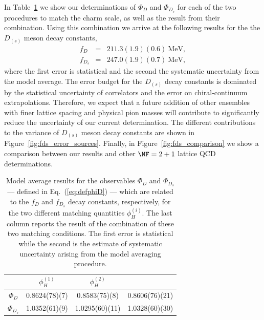 In Table~\ref{tab:dec_res_all_matching} we show our determinations of $\Phi_D$
and $\Phi_{D_s}$ for each of the two procedures to match the charm scale, as well
as the result from their combination. Using this combination we arrive at the following results for the the $D_{(s)}$ meson decay constants,
\begin{eqnarray}
	f_D &=& 211.3(1.9)(0.6) \ \mathrm{MeV},
	\\
	f_{D_s} &=& 247.0(1.9)(0.7) \ \mathrm{MeV},
\end{eqnarray}
where the first error is statistical and the second the systematic uncertainty from the model average.
The error budget for the $D_{(s)}$ decay constants is dominated by the statistical uncertainty of 
correlators and the  error on chiral-continuum extrapolations. Therefore, we expect that a future addition of other
ensembles with finer lattice spacing and physical pion masses will contribute to significantly reduce the uncertainty of our current 
determination. The different contributions to the variance of $D_{(s)}$ meson decay constants are 
shown in Figure~\ref{fig:fds_error_sources}. Finally, in  Figure~\ref{fig:fds_comparison} we show a comparison between our results and other $\NF=2+1$ lattice QCD determinations.
%
\begin{table}[t!]
	\begin{center}	
		\begin{tabular}{c ||  c c  c    }
			\hline
			&  $\phi_{H}^{(1)}$ & $\phi_{H}^{(2)} $  &  \text{combined} \\ [0.5ex]
			\hline\hline
			$\Phi_D$ &  0.8624(78)(7) & 0.8583(75)(8) &   0.8606(76)(21)   \\ [0.5ex]
			$\Phi_{D_s}$ & 1.0352(61)(9) & 1.0295(60)(11) &  1.0328(60)(30) 
		\end{tabular}
		\caption{Model average results for the observables $\Phi_D$ and $\Phi_{D_s}$ --- defined in Eq.~(\ref{eq:defphiD}) ---  which are related to the $f_D$ and $f_{D_s}$ decay constants, respectively, for
		the two different matching quantities $\phi_H^{(i)}$. The last column reports the result of the combination of these two matching conditions. The first error is statistical while the second is the estimate of systematic uncertainty arising from the model averaging procedure. }
		\label{tab:dec_res_all_matching}
	\end{center}
\end{table}


